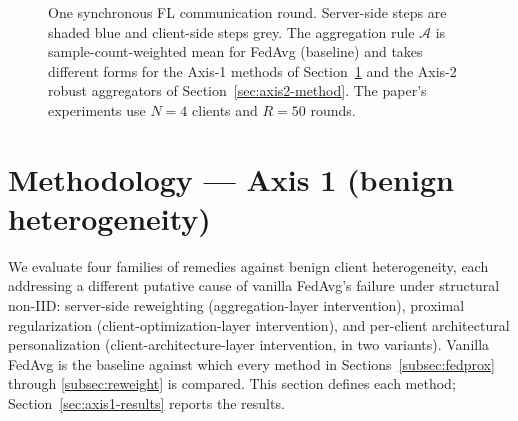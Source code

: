 \documentclass[preprint,12pt,authoryear]{elsarticle}
\begin{document}
\begin{figure}[!ht]
\centering
{}
\caption{One synchronous FL communication round. Server-side steps are shaded blue and client-side steps grey. The aggregation rule $\mathcal{A}$ is sample-count-weighted mean for FedAvg (baseline) and takes different forms for the Axis-1 methods of Section~\ref{sec:axis1-method} and the Axis-2 robust aggregators of Section~\ref{sec:axis2-method}. The paper's experiments use $N = 4$ clients and $R = 50$ rounds.}
\label{fig:round}
\end{figure}


\section{Methodology --- Axis 1 (benign heterogeneity)}
\label{sec:axis1-method}

We evaluate four families of remedies against benign client
heterogeneity, each addressing a different putative cause of
vanilla FedAvg's failure under structural non-IID: server-side
reweighting (aggregation-layer intervention), proximal
regularization (client-optimization-layer intervention), and
per-client architectural personalization (client-architecture-layer
intervention, in two variants). Vanilla FedAvg is the baseline
against which every method in Sections~\ref{subsec:fedprox}
through \ref{subsec:reweight} is compared. This section defines
each method; Section~\ref{sec:axis1-results} reports the results.
\end{document}
